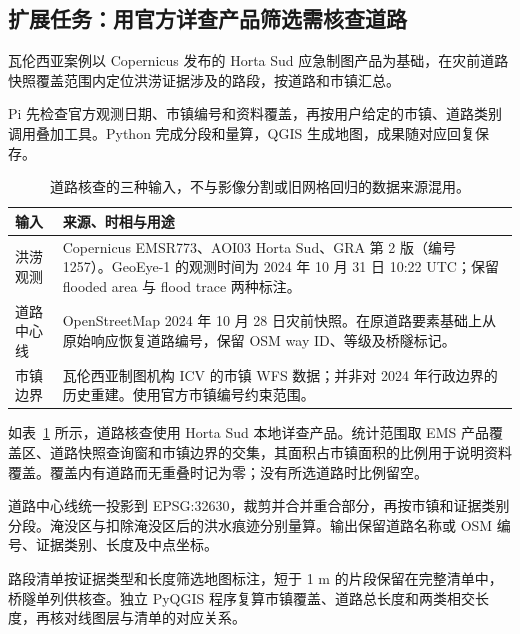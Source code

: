 \subsection{扩展任务：用官方详查产品筛选需核查道路}
瓦伦西亚案例以 Copernicus 发布的 Horta Sud 应急制图产品为基础\cite{ems}，在灾前道路快照覆盖范围内定位洪涝证据涉及的路段，按道路和市镇汇总。

Pi 先检查官方观测日期、市镇编号和资料覆盖，再按用户给定的市镇、道路类别调用叠加工具。Python 完成分段和量算，QGIS 生成地图，成果随对应回复保存。

\begin{table}[htbp]
\centering
\caption{道路核查的三种输入，不与影像分割或旧网格回归的数据来源混用。}
\label{tab:transport-inputs}
\small
\begin{tabularx}{\linewidth}{@{}p{28mm}X@{}}
\toprule
输入 & 来源、时相与用途\\
\midrule
洪涝观测 & Copernicus EMSR773、AOI03 Horta Sud、GRA 第 2 版（编号 1257）。GeoEye-1 的观测时间为 2024 年 10 月 31 日 10:22 UTC；保留 flooded area 与 flood trace 两种标注。\\
道路中心线 & OpenStreetMap 2024 年 10 月 28 日灾前快照。在原道路要素基础上从原始响应恢复道路编号，保留 OSM way ID、等级及桥隧标记。\\
市镇边界 & 瓦伦西亚制图机构 ICV 的市镇 WFS 数据\cite{icv}；并非对 2024 年行政边界的历史重建。使用官方市镇编号约束范围。\\
\bottomrule
\end{tabularx}
\end{table}

如表~\ref{tab:transport-inputs} 所示，道路核查使用 Horta Sud 本地详查产品。统计范围取 EMS 产品覆盖区、道路快照查询窗和市镇边界的交集，其面积占市镇面积的比例用于说明资料覆盖。覆盖内有道路而无重叠时记为零；没有所选道路时比例留空。

道路中心线统一投影到 EPSG:32630，裁剪并合并重合部分，再按市镇和证据类别分段。淹没区与扣除淹没区后的洪水痕迹分别量算。输出保留道路名称或 OSM 编号、证据类别、长度及中点坐标。

路段清单按证据类型和长度筛选地图标注，短于 1 m 的片段保留在完整清单中，桥隧单列供核查。独立 PyQGIS 程序复算市镇覆盖、道路总长度和两类相交长度，再核对线图层与清单的对应关系。
